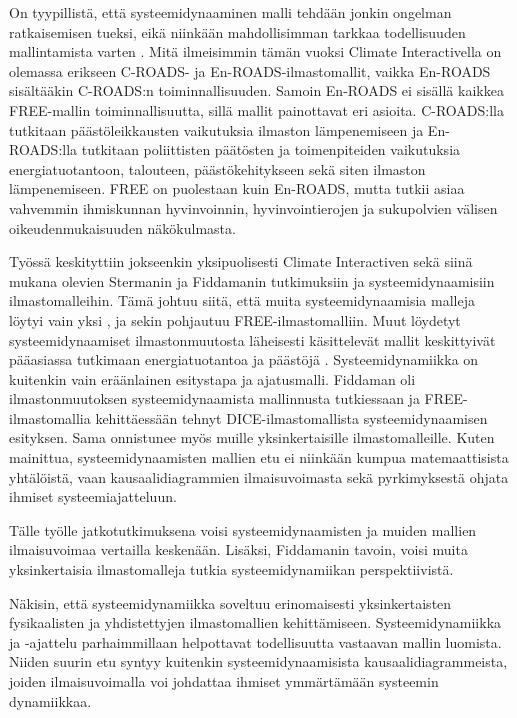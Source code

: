 \documentclass[finnish,12pt,a4paper,pdftex]{article}
\begin{document}
\begin{onehalfspacing}
On tyypillistä, että systeemidynaaminen malli tehdään jonkin ongelman ratkaisemisen tueksi, eikä niinkään mahdollisimman tarkkaa todellisuuden mallintamista varten \cite{Sterman2000}. Mitä ilmeisimmin tämän vuoksi Climate Interactivella on olemassa erikseen C-ROADS- ja En-ROADS-ilmastomallit, vaikka En-ROADS sisältääkin C-ROADS:n toiminnallisuuden. Samoin En-ROADS ei sisällä kaikkea FREE-mallin toiminnallisuutta, sillä mallit painottavat eri asioita. C-ROADS:lla tutkitaan päästöleikkausten vaikutuksia ilmaston lämpenemiseen ja En-ROADS:lla tutkitaan poliittisten päätösten ja toimenpiteiden vaikutuksia energiatuotantoon, talouteen, päästökehitykseen sekä siten ilmaston lämpenemiseen. FREE on puolestaan kuin En-ROADS, mutta tutkii asiaa vahvemmin ihmiskunnan hyvinvoinnin, hyvinvointierojen ja sukupolvien välisen oikeudenmukaisuuden näkökulmasta. 

Työssä keskityttiin jokseenkin yksipuolisesti Climate Interactiven sekä siinä mukana olevien Stermanin ja Fiddamanin tutkimuksiin ja systeemidynaamisiin ilmastomalleihin. Tämä johtuu siitä, että muita systeemidynaamisia malleja löytyi vain yksi \cite{Evan2007}, ja sekin pohjautuu FREE-ilmastomalliin. Muut löydetyt systeemidynaamiset ilmastonmuutosta läheisesti käsittelevät mallit keskittyivät pääasiassa tutkimaan energiatuotantoa ja päästöjä \cite{Kunsch2003, Shrestha2012, Mediavilla2013}. Systeemidynamiikka on kuitenkin vain eräänlainen esitystapa ja ajatusmalli. Fiddaman oli ilmastonmuutoksen systeemidynaamista mallinnusta tutkiessaan ja FREE-ilmastomallia kehittäessään tehnyt DICE-ilmastomallista systeemidynaamisen esityksen. Sama onnistunee myös muille yksinkertaisille ilmastomalleille. Kuten mainittua, systeemidynaamisten mallien etu ei niinkään kumpua matemaattisista yhtälöistä, vaan kausaalidiagrammien ilmaisuvoimasta sekä pyrkimyksestä ohjata ihmiset systeemiajatteluun. 

Tälle työlle jatkotutkimuksena voisi systeemidynaamisten ja muiden mallien ilmaisuvoimaa vertailla keskenään. Lisäksi, Fiddamanin tavoin, voisi muita yksinkertaisia ilmastomalleja tutkia systeemidynamiikan perspektiivistä. 

Näkisin, että systeemidynamiikka soveltuu erinomaisesti yksinkertaisten fysikaalisten ja yhdistettyjen ilmastomallien kehittämiseen. Systeemidynamiikka ja -ajattelu parhaimmillaan helpottavat todellisuutta vastaavan mallin luomista. Niiden suurin etu syntyy kuitenkin systeemidynaamisista kausaalidiagrammeista, joiden ilmaisuvoimalla voi johdattaa ihmiset ymmärtämään systeemin dynamiikkaa. 


\end{onehalfspacing}
\end{document}
